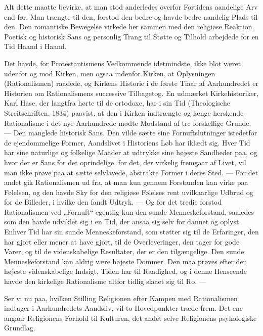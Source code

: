 \documentclass[12pt,a4paper,openany]{book}
\newcommand{\opage}[1]{\marginnote{\footnotesize\textit{[#1]}}}
\begin{document}
Alt dette maatte bevirke, at man stod anderledes overfor Fortidens
aandelige Arv end før. Man trængte til den, forstod den bedre og
havde bedre aandelig Plads til den. Den romantiske Bevægelse virkede
her sammen med den religiøse Reaktion. Poetisk og historisk
\opage{122}Sans og personlig Trang til Støtte og Tilhold arbejdede for en Tid
Haand i Haand.

Det havde, for Protestantismens Vedkommende idetmindste, ikke
blot været udenfor og mod Kirken, men ogsaa indenfor Kirken, at
Oplysningen (Rationalismen) raadede, og Kirkens Historie i de første
Tiaar af Aarhundredet er Historien om Rationalismens successive
Tilbagetog. En udmærket Kirkehistoriker, Karl Hase, der langtfra
hørte til de ortodoxe, har i sin Tid (Theologische Streitschriften.
1834) paavist, at den i Kirken indtrængte og længe herskende Rationalisme
i det nye Aarhundrede mødte Modstand af tre forskellige
Grunde. --- Den manglede historisk Sans. Den vilde sætte sine Fornuftslutninger
istedetfor de ejendommelige Former, Aandslivet i Historiens
Løb har iklædt sig. Hver Tid har sine naturlige og folkelige
Maader at udtrykke sine højeste Sandheder paa, og hvor der er Sans
for det oprindelige, for det, der virkelig fremgaar af Livet, vil man
ikke prøve paa at sætte selvlavede, abstrakte Former i deres Sted.
--- For det andet gik Rationalismen ud fra, at man kun gennem Forstanden
kan virke paa Følelsen, og den havde Sky for den religiøse
Følelses rent uvilkaarlige Udbrud og for de Billeder, i hvilke den
fandt Udtryk. --- Og for det tredie forstod Rationalismen ved „Fornuft“
egentlig kun den sunde Menneskeforstand, saaledes som den
havde udviklet sig i en Tid, der ansaa sig selv for dannet og oplyst.
Enhver Tid har sin sunde Menneskeforstand, som støtter sig til de
Erfaringer, den har gjort eller mener at have gjort, til de Overleveringer,
den tager for gode Varer, og til de videnskabelige Resultater,
der er den tilgængelige. Den sunde Menneskeforstand kan aldrig
være højeste Dommer. Den maa prøves efter den højeste videnskabelige
Indsigt, Tiden har til Raadighed, og i denne Henseende havde
den kirkelige Rationalisme altfor tidlig slaaet sig til Ro. ---

Ser vi nu paa, hvilken Stilling Religionen efter Kampen med Rationalismen
indtager i Aarhundredets Aandsliv, vil to Hovedpunkter
træde frem. Det ene angaar Religionens Forhold til Kulturen, det
andet selve Religionens psykologiske Grundlag.
\end{document}
